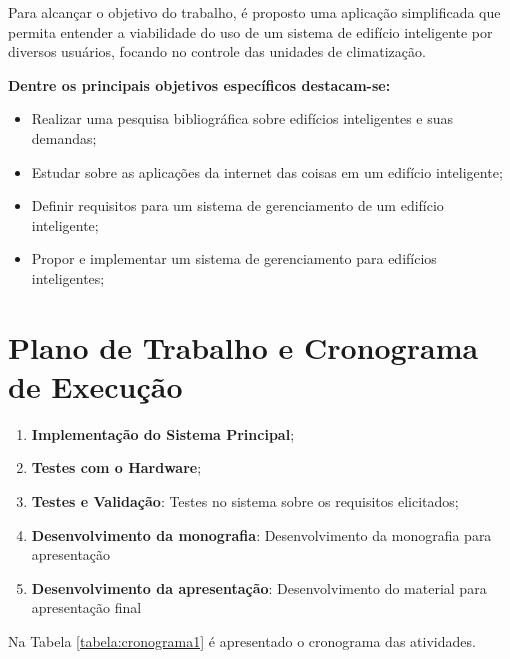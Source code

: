 \documentclass[
	12pt,				%
	a4paper,			%
	english,			%
	brazil,				%
	]{article}
\begin{document}
Para alcançar o objetivo do trabalho, é proposto uma aplicação simplificada que permita entender a viabilidade do uso de um 
sistema de edifício inteligente por diversos usuários, focando no controle das unidades de climatização.


{\bf Dentre os principais objetivos específicos destacam-se: }

\begin{itemize}
    \item Realizar uma pesquisa bibliográfica sobre edifícios inteligentes e suas demandas;
    \item Estudar sobre as aplicações da internet das coisas em um edifício inteligente;
    \item Definir requisitos para um sistema de gerenciamento de um edifício inteligente;
    \item Propor e implementar um sistema de gerenciamento para edifícios inteligentes;
\end{itemize}


\section{Plano de Trabalho e Cronograma de Execução}
    \begin{enumerate}
        \item \textbf{Implementação do Sistema Principal}; \label{a4}
        
        \item \textbf{Testes com o Hardware}; \label{a5}
        
        \item \textbf{Testes e Validação}: Testes no sistema sobre os requisitos elicitados; \label{a6}
        
        \item \textbf{Desenvolvimento da monografia}: Desenvolvimento da monografia para apresentação \label{a7}
        
        \item \textbf{Desenvolvimento da apresentação}: Desenvolvimento do material para apresentação final  \label{a8}

    \end{enumerate}

    Na Tabela \ref{tabela:cronograma1} é apresentado o cronograma das atividades.
 
\end{document}
